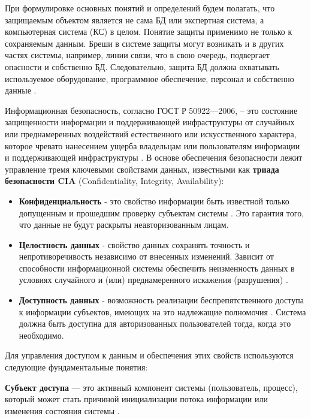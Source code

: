 При формулировке основных понятий и определений будем полагать, что защищаемым объектом является не сама БД или экспертная система, а компьютерная система (КС) в целом. Понятие защиты применимо не только к сохраняемым данным. Бреши в системе защиты могут возникать и в других частях системы, например, линии связи, что в свою очередь, подвергает опасности и собственно БД. Следовательно, защита БД должна охватывать используемое оборудование, программное обеспечение, персонал и собственно данные \autocite[сс. 15-18]{Skakun}. 

Информационная безопасность, согласно ГОСТ Р 50922—2006, – это состояние защищенности информации и поддерживающей инфраструктуры от случайных или преднамеренных воздействий естественного или искусственного характера, которое чревато нанесением ущерба владельцам или пользователям информации и поддерживающей инфраструктуры \autocite{GOST50922}. В основе обеспечения безопасности лежит управление тремя ключевыми свойствами данных, известными как \textbf{триада безопасности CIA} (Confidentiality, Integrity, Availability):

\begin{itemize}
    \item \textbf{Конфиденциальность} - это свойство информации быть известной только допущенным и прошедшим проверку субъектам системы \autocite[сс. 15-18]{Skakun}. Это гарантия того, что данные не будут раскрыты неавторизованным лицам.
    \item \textbf{Целостность данных} - свойство данных сохранять точность и непротиворечивость независимо от внесенных изменений. Зависит от способности информационной системы обеспечить неизменность данных в условиях случайного и (или) преднамеренного искажения (разрушения) \autocite[сс. 15-18]{Skakun}.
    \item \textbf{Доступность данных} - возможность реализации беспрепятственного доступа к информации субъектов, имеющих на это надлежащие полномочия \autocite[сс. 15-18]{Skakun}. Система должна быть доступна для авторизованных пользователей тогда, когда это необходимо.
\end{itemize}

Для управления доступом к данным и обеспечения этих свойств используются следующие фундаментальные понятия:

\textbf{Субъект доступа} — это активный компонент системы (пользователь, процесс), который может стать причиной инициализации потока информации или изменения состояния системы \autocite[сс. 15-18]{Skakun}. 

